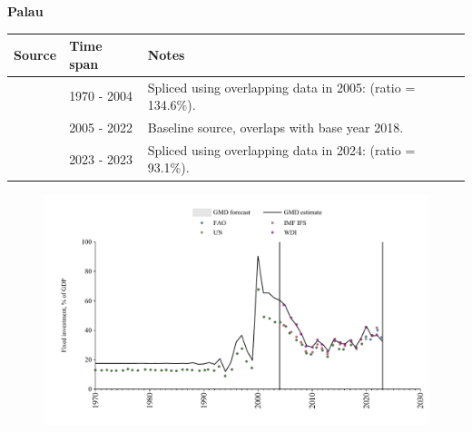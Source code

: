 \documentclass[12pt,a4paper,landscape]{article}
\begin{document}
\begin{adjustbox}{max totalsize={\paperwidth}{\paperheight},center}
\begin{minipage}[t][\textheight][t]{\textwidth}
\vspace*{0.5cm}
{}
\begin{center}
{\Large\bfseries Palau}
\end{center}
\vspace{0.5cm}
\begin{table}[H]
\centering
\small
\begin{tabular}{|l|l|l|}
\hline
\textbf{Source} & \textbf{Time span} & \textbf{Notes} \\
\hline
\rowcolor{white}\cite{UN}& 1970 - 2004 &Spliced using overlapping data in 2005: (ratio = 134.6\%).\\
\rowcolor{lightgray}\cite{WDI}& 2005 - 2022 &Baseline source, overlaps with base year 2018.\\
\rowcolor{white}\cite{FAO}& 2023 - 2023 &Spliced using overlapping data in 2024: (ratio = 93.1\%).\\
\hline
\end{tabular}
\end{table}
\begin{figure}[H]
\centering
\includegraphics[width=\textwidth,height=0.6\textheight,keepaspectratio]{graphs/PLW_finv_GDP.pdf}
\end{figure}
\end{minipage}
\end{adjustbox}
\end{document}
